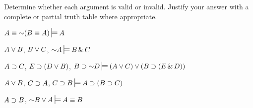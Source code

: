 \noindent\problempart Determine whether each argument is valid or invalid. Justify your answer with a complete or partial truth table where appropriate.
\label{pr.TT.valid} 
\begin{exercises}
\item $A\eiff\enot(B\eiff A)\sdtstile{}{}A$ %



\item $A\vee B$, $B\vee C$, $\enot A\sdtstile{}{}B \eand C$ %



\item $A \supset C$, $E \supset (D \vee B)$, $B \eif \enot D\sdtstile{}{}(A \eor C) \eor (B \eif (E \eand D))$ %



\item $A \vee B$, $C \supset A$, $C \eif B\sdtstile{}{}A \eif (B \eif C)$ %



\item $A \supset B$, $\enot B \eor A\sdtstile{}{}A \eiff B$ %



\end{exercises}

